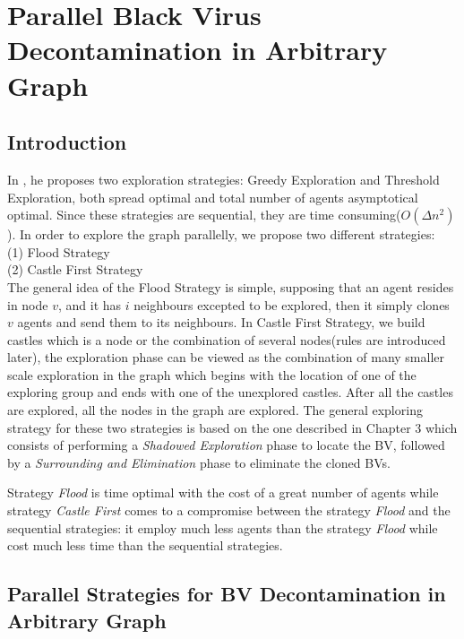 \chapter {Parallel Black Virus Decontamination in Arbitrary Graph}
\label{TL}

\section{Introduction}
In \cite{Cai}, he proposes two exploration strategies: Greedy Exploration and Threshold Exploration, both spread optimal and total number of agents asymptotical optimal. Since these strategies are sequential, they are time consuming($O(\Delta n^2)$).  In order to explore the graph parallelly, we propose two different strategies: \\
(1) Flood Strategy\\
(2) Castle First Strategy\\
The general idea of the Flood Strategy is simple, supposing that an agent resides in node $v$, and it has $i$ neighbours excepted to be explored, then it simply clones $v$ agents and send them to its neighbours. In Castle First Strategy, we build castles which is a node or the combination of several nodes(rules are introduced later), the exploration phase can be viewed as the combination of many smaller scale exploration in the graph which begins with the location of one of the exploring group and ends with one of the unexplored castles. After all the castles are explored, all the nodes in the graph are explored. The general exploring strategy for these two strategies is based on the one described in Chapter 3 which consists of performing a {\em Shadowed Exploration} phase to locate the BV, followed by a {\em Surrounding and Elimination} phase to eliminate the cloned BVs. 

Strategy {\em Flood}  is time optimal with the cost of a great number of agents while strategy {\em Castle First} comes to a compromise between the strategy {\em Flood} and the sequential strategies: it employ much less agents than the strategy {\em Flood} while cost much less time than the sequential strategies. 

\section{Parallel Strategies for BV Decontamination in Arbitrary Graph}
